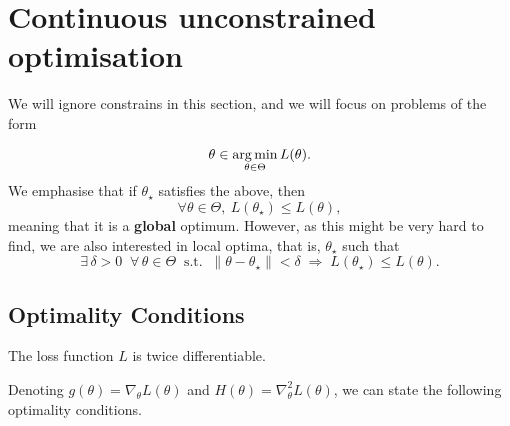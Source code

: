 \begin{mdframed}[style=ejemplo, frametitle={\center Example: XXX}]

\end{mdframed}


\section{Continuous unconstrained optimisation} %
\label{sec:continuous_optimisation}

We will ignore constrains in this section, and we will focus on problems of the form

\begin{equation}
	\theta \in \operatorname*{arg\,min}_{\theta\in\Theta} L(\theta).
\end{equation}
We emphasise that if $\theta_\star$ satisfies the above, then
\begin{equation}
	\forall \theta\in\Theta,~ L(\theta_\star) \leq L(\theta),
\end{equation}
meaning that it is a \textbf{global} optimum. However, as this might be very hard to find, we are also interested in local optima, that is, $\theta_\star$  such that 
\begin{equation}
\exists\, \delta > 0 \;\; \forall\, \theta \in \Theta \;\; 
\text{s.t.} \;\; 
\|\theta - \theta_\star\| < \delta 
\;\Rightarrow\;
L(\theta_\star) \le L(\theta).
\end{equation}


\subsection{Optimality Conditions}
\label{subsec:optimality_conditions}


\begin{assumption}
The loss function $L$ is twice differentiable.
\end{assumption}

Denoting $g(\theta) = \nabla_\theta L(\theta)$ and $H(\theta) = \nabla_\theta^2L(\theta)$, we can state the following optimality conditions. 

